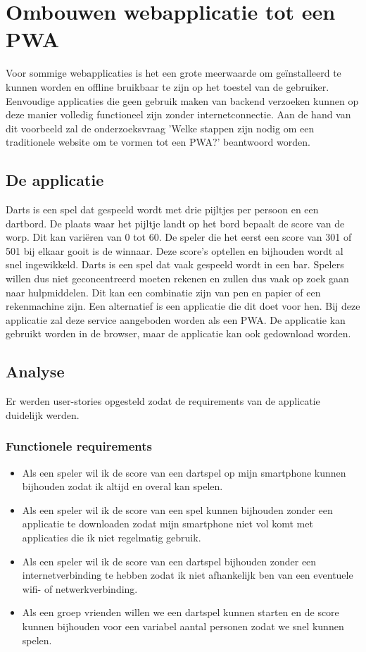 \chapter{Ombouwen webapplicatie tot een PWA}
\label{ch:TransformerenNaarEenPWA}

Voor sommige webapplicaties is het een grote meerwaarde om geïnstalleerd te kunnen worden  en offline bruikbaar te zijn op het toestel van de gebruiker.\autocite{Mozilla2020c} Eenvoudige applicaties die geen gebruik maken van backend verzoeken kunnen op deze manier volledig functioneel zijn zonder internetconnectie. 
Aan de hand van dit voorbeeld zal de onderzoeksvraag 'Welke stappen zijn nodig om een traditionele website om te vormen tot een PWA?' beantwoord worden.

\section{De applicatie}

	Darts is een spel dat gespeeld wordt met drie pijltjes per persoon en een dartbord. De plaats waar het pijltje landt op het bord bepaalt de score van de worp. Dit kan variëren van 0 tot 60. De speler die het eerst een score van 301 of  501 bij elkaar gooit is de winnaar. Deze score’s optellen en bijhouden wordt al snel ingewikkeld. Darts is een spel dat vaak gespeeld wordt in een bar. Spelers willen dus niet geconcentreerd moeten rekenen en zullen dus vaak op zoek gaan naar hulpmiddelen. Dit kan een combinatie zijn van pen en papier of een rekenmachine zijn. Een alternatief is een applicatie die dit doet voor hen. Bij deze applicatie zal deze service aangeboden worden als een PWA. De applicatie kan gebruikt worden in de browser, maar de applicatie kan ook gedownload worden.

\section{Analyse}

	Er werden user-stories opgesteld zodat de requirements van de applicatie duidelijk werden.  
	
	\subsection{Functionele requirements}
		\begin{itemize}
			 \item 	Als een speler wil ik de score van een dartspel op mijn smartphone kunnen bijhouden zodat ik altijd en overal kan spelen.
			 \item 	Als een speler wil ik de score van een spel kunnen bijhouden zonder een applicatie te downloaden zodat mijn smartphone niet vol komt met applicaties die ik niet regelmatig gebruik.
			 \item 	Als een speler wil ik de score van een dartspel bijhouden zonder een internetverbinding te hebben zodat ik niet afhankelijk ben van een eventuele wifi-  of netwerkverbinding.
			 \item 	Als een groep vrienden willen we een dartspel kunnen starten en de score kunnen bijhouden voor een variabel aantal personen zodat we snel kunnen spelen.
		\end{itemize}	
	
